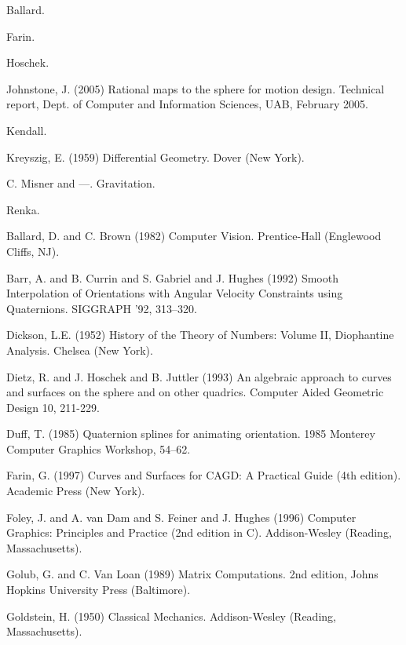 \documentclass[11pt]{article}
\begin{document}

\begin{thebibliography}{99}

Ballard.

Farin.

Hoschek.

Johnstone, J. (2005) Rational maps to the sphere for motion design.
Technical report, Dept. of Computer and Information Sciences, UAB, February 2005.

Kendall.

Kreyszig, E. (1959) Differential Geometry.
Dover (New York).

C. Misner and ---.
Gravitation.

Renka.


Ballard, D. and C. Brown (1982)
Computer Vision.
Prentice-Hall (Englewood Cliffs, NJ).

Barr, A. and B. Currin and S. Gabriel and J. Hughes (1992)
Smooth Interpolation of Orientations with Angular Velocity Constraints
using Quaternions.
SIGGRAPH '92, 313--320.

Dickson, L.E. (1952) History of the Theory of Numbers: Volume II,
Diophantine Analysis.  Chelsea (New York).

Dietz, R. and J. Hoschek and B. Juttler (1993)
An algebraic approach to curves and surfaces on the sphere and
on other quadrics.
Computer Aided Geometric Design 10, 211-229.

Duff, T. (1985)
Quaternion splines for animating orientation.
1985 Monterey Computer Graphics Workshop, 54--62.

Farin, G. (1997)
Curves and Surfaces for CAGD: A Practical Guide (4th edition).
Academic Press (New York).

Foley, J. and A. van Dam and S. Feiner and J. Hughes (1996)
Computer Graphics: Principles and Practice (2nd edition in C).
Addison-Wesley (Reading, Massachusetts).

Golub, G. and C. Van Loan (1989)
Matrix Computations.
2nd edition, Johns Hopkins University Press (Baltimore).

Goldstein, H. (1950)
Classical Mechanics.
Addison-Wesley (Reading, Massachusetts).


\end{thebibliography}
\end{document}
